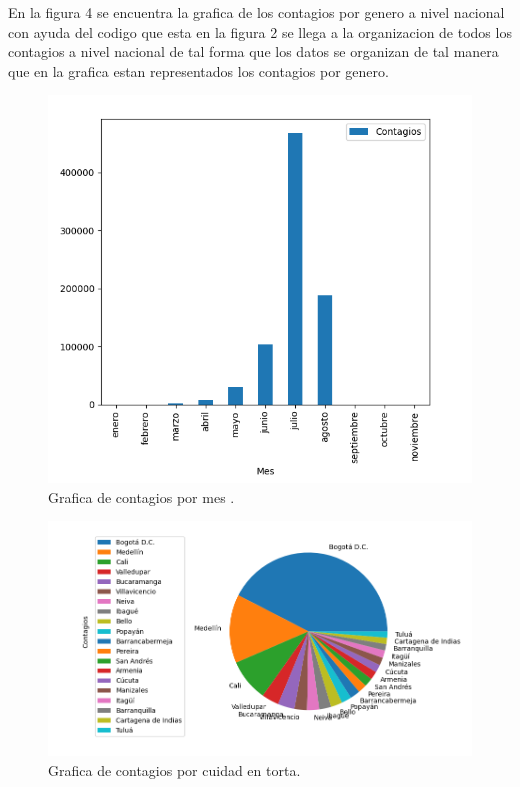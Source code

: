 \documentclass[conference,compsoc,onecolumn]{IEEEtran}
\begin{document}
En la figura 4 se encuentra la grafica de los contagios por genero a nivel nacional con ayuda del codigo que esta en la figura 2 se llega a la organizacion de todos los contagios a nivel nacional de tal forma que los datos se organizan de tal manera que en la grafica estan representados los contagios por genero.\\ 

\begin{figure}[h!]
    \centering
    \includegraphics[scale=0.4]{images/Contagios_Por_Mes.png}
    \caption{Grafica de contagios por mes .}
    \label{fig:fig1}
\end{figure}

\begin{figure}[h!]
    \centering
    \includegraphics[scale=0.4]{images/Contagios_Por_ciudad_torta.png}
    \caption{Grafica de contagios por cuidad en  torta.}
    \label{fig:fig1}
\end{figure}
\end{document}
